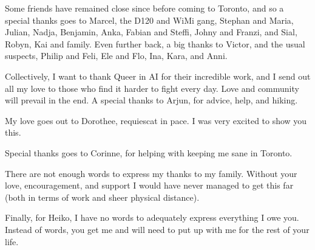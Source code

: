 Some friends have remained close since before coming to Toronto, and so a special thanks goes to Marcel, the D120 and WiMi gang, Stephan and Maria, Julian, Nadja, Benjamin, Anka, Fabian and Steffi, Johny and Franzi, and Sial, Robyn, Kai and family. Even further back, a big thanks to Victor, and the usual suspects, Philip and Feli, Ele and Flo, Ina, Kara, and Anni.

Collectively, I want to thank Queer in AI for their incredible work, and I send out all my love to those who find it harder to fight every day.
Love and community will prevail in the end.
A special thanks to Arjun, for advice, help, and hiking.

My love goes out to Dorothee, requiescat in pace.
I was very excited to show you this.

Special thanks goes to Corinne, for helping with keeping me sane in Toronto.

There are not enough words to express my thanks to my family.
Without your love, encouragement, and support I would have never managed to get this far (both in terms of work and sheer physical distance).

Finally, for Heiko, I have no words to adequately express everything I owe you.
Instead of words, you get me and will need to put up with me for the rest of your life.
